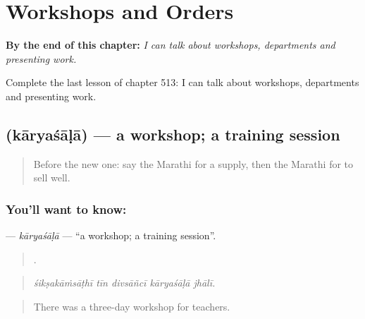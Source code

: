 
\chapter{Workshops and Orders}
\label{ch:mr-workshops-and-orders}

\begin{chapteropening}
\textbf{By the end of this chapter:} \emph{I can talk about workshops, departments and presenting work.}

Complete the last lesson of chapter 513: I can talk about workshops, departments and presenting work.
\end{chapteropening}

\section[\texorpdfstring{\mr{कार्यशाळा} (kāryaśāḷā)}{कार्यशाळा (kāryaśāḷā)}]{ (kāryaśāḷā) — a workshop; a training session}

\label{lesson:MR-C513-karyasala}



\begin{quote}
Before the new one: say the Marathi for a supply, then the Marathi for to sell well.
\end{quote}

\subsection*{You'll want to know: }
\textbf{} — \emph{kāryaśāḷā} — \textquotedblleft{}a workshop; a training session\textquotedblright{}.

\begin{quote}
    .
\end{quote}

\begin{quote}
\emph{śikṣakāṁsāṭhī tīn divsāñcī kāryaśāḷā jhālī.}
\end{quote}

\begin{quote}
There was a three-day workshop for teachers.
\end{quote}

